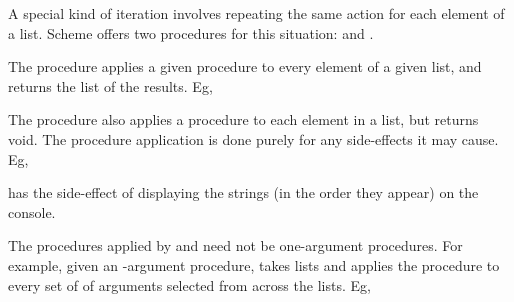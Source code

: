 A special kind of iteration involves repeating the same
action for each element of a list.  Scheme offers two
procedures for this situation:  and .

The  procedure applies a given procedure to every
element of a given list, and returns the list of the
results.  Eg,


The  procedure also applies a procedure to each
element in a list, but returns void.  The procedure
application is done purely for any side-effects it may
cause.  Eg,


\n has the side-effect of displaying the strings (in
  the order they appear) on the console.

The procedures applied by  and 
need not be one-argument procedures.  For example,
given an -argument procedure, 
takes  lists and applies the procedure to
every set of  of arguments selected from across
the lists.  Eg,

